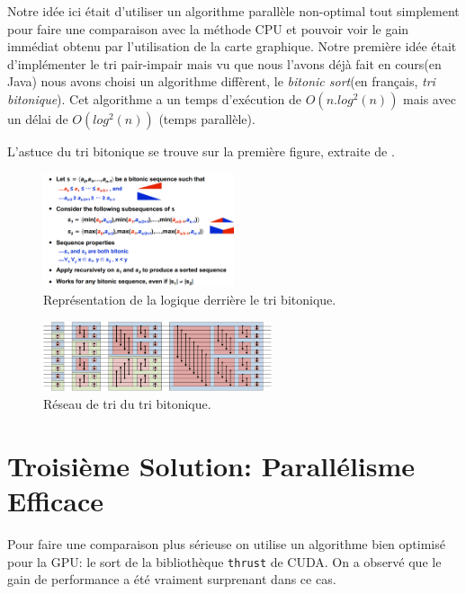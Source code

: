 \documentclass[12pt,oneside]{article}
\begin{document}
Notre idée ici était d'utiliser un algorithme parallèle non-optimal tout simplement pour faire une comparaison avec la méthode CPU et pouvoir voir le gain immédiat obtenu par l'utilisation de la carte graphique. Notre première idée était d’implémenter le tri pair-impair mais vu que nous l'avons déjà fait en cours(en Java) nous avons choisi un algorithme diffèrent, le \textit{bitonic sort}(en français, \textit{tri bitonique}). Cet algorithme a un temps d’exécution de $O(n.log^{2}(n))$ mais avec un délai de $O(log^{2}(n))$ (temps parallèle). \newline

 L'astuce du tri bitonique se trouve sur la première figure, extraite de \cite{Venu}.






\begin{figure}[h]
\centering
\includegraphics[width=0.5\textwidth]{../figures/bitonic_split.png}
\caption{\label{fig:BitonicSort}Représentation de la logique derrière le tri bitonique.}
\end{figure}

\begin{figure}[h]
\centering
\includegraphics[width=0.6\textwidth]{../figures/BitonicSort1.png}
\caption{\label{fig:BitonicSort}Réseau de tri du tri bitonique.}
\end{figure}

\newpage

\section{Troisième Solution: Parallélisme Efficace}

Pour faire une comparaison plus sérieuse on utilise un algorithme bien optimisé pour la GPU: le sort de la bibliothèque \texttt{thrust} de CUDA. On a observé que le gain de performance a été vraiment surprenant dans ce cas.
\end{document}
